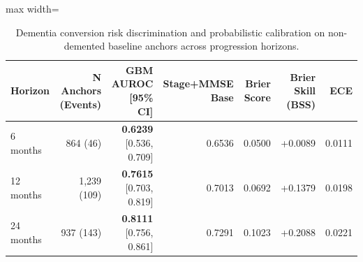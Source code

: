 \begin{table}[t]
\centering
\caption{Dementia conversion risk discrimination and probabilistic calibration on non-demented baseline anchors across progression horizons.}
\label{tab:conversion_metrics}
\small
\begin{adjustbox}{max width=\linewidth}
\begin{tabular}{lrrrrrr}
\toprule
\textbf{Horizon} & \textbf{N Anchors (Events)} & \textbf{GBM AUROC [95\% CI]} & \textbf{Stage+MMSE Base} & \textbf{Brier Score} & \textbf{Brier Skill (BSS)} & \textbf{ECE} \\
\midrule
6 months  & 864 (46)  & \textbf{0.6239} [0.536, 0.709] & 0.6536 & 0.0500 & +0.0089 & 0.0111 \\
12 months & 1,239 (109) & \textbf{0.7615} [0.703, 0.819] & 0.7013 & 0.0692 & +0.1379 & 0.0198 \\
24 months & 937 (143)   & \textbf{0.8111} [0.756, 0.861] & 0.7291 & 0.1023 & +0.2088 & 0.0221 \\
\bottomrule
\end{tabular}
\end{adjustbox}
\end{table}
